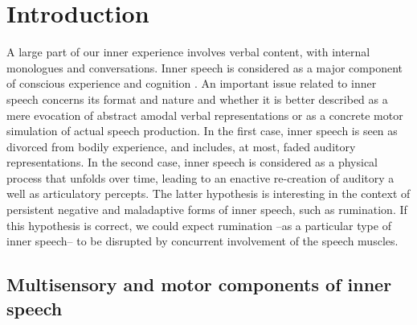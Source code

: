 \documentclass[12pt,]{book}
\begin{document}
\section{Introduction}\label{introduction}

A large part of our inner experience involves verbal content, with
internal monologues and conversations. Inner speech is considered as a
major component of conscious experience and cognition
\citep{Hubbard2010, Klinger1987, Hurlburt2013}. An important issue
related to inner speech concerns its format and nature and whether it is
better described as a mere evocation of abstract amodal verbal
representations or as a concrete motor simulation of actual speech
production. In the first case, inner speech is seen as divorced from
bodily experience, and includes, at most, faded auditory
representations. In the second case, inner speech is considered as a
physical process that unfolds over time, leading to an enactive
re-creation of auditory a well as articulatory percepts. The latter
hypothesis is interesting in the context of persistent negative and
maladaptive forms of inner speech, such as rumination. If this
hypothesis is correct, we could expect rumination --as a particular type
of inner speech-- to be disrupted by concurrent involvement of the
speech muscles.

\subsection{Multisensory and motor components of inner
speech}\label{multisensory-and-motor-components-of-inner-speech}
\end{document}
